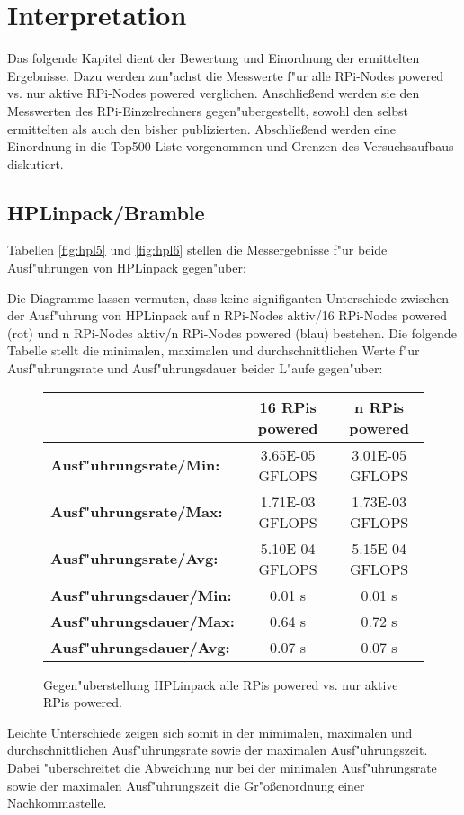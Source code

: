 \chapter{Interpretation}\label{Kap4}

Das folgende Kapitel dient der Bewertung und Einordnung der ermittelten Ergebnisse. Dazu werden zun"achst die Messwerte f"ur alle RPi-Nodes powered vs. nur aktive RPi-Nodes powered verglichen. Anschlie\ss end werden sie den Messwerten des RPi-Einzelrechners gegen"ubergestellt, sowohl den selbst ermittelten als auch den bisher publizierten. Abschlie\ss end werden eine Einordnung in die Top500-Liste vorgenommen und Grenzen des Versuchsaufbaus diskutiert. 

\section{HPLinpack/Bramble}\label{Interpretation-Linpack}

Tabellen \ref{fig:hpl5} und \ref{fig:hpl6} stellen die Messergebnisse f"ur beide Ausf"uhrungen von HPLinpack gegen"uber: 



\noindent
Die Diagramme lassen vermuten, dass keine signifiganten Unterschiede zwischen der Ausf"uhrung von HPLinpack auf n RPi-Nodes aktiv/16 RPi-Nodes powered (rot) und n RPi-Nodes aktiv/n RPi-Nodes powered (blau) bestehen. Die folgende Tabelle stellt die minimalen, maximalen und durchschnittlichen Werte f"ur Ausf"uhrungsrate und Ausf"uhrungsdauer beider L"aufe gegen"uber: 

\begin{figure}[h!]
  \centering
  \begin{tabular}{|l|c|c|}
    \hline 
     & \textbf{16 RPis powered} & \textbf{n RPis powered}\\ 
    \hline 
    \textbf{Ausf"uhrungsrate/Min:} & 3.65E-05 GFLOPS & 3.01E-05 GFLOPS \\
    \hline 
    \textbf{Ausf"uhrungsrate/Max:} & 1.71E-03 GFLOPS & 1.73E-03 GFLOPS \\
    \hline 
    \textbf{Ausf"uhrungsrate/Avg:} & 5.10E-04 GFLOPS & 5.15E-04 GFLOPS \\
    \hline 
    \textbf{Ausf"uhrungsdauer/Min:} & 0.01 s & 0.01 s \\
    \hline 
    \textbf{Ausf"uhrungsdauer/Max:} & 0.64 s & 0.72 s \\
	\hline 
    \textbf{Ausf"uhrungsdauer/Avg:} & 0.07 s & 0.07 s\\
    \hline
  \end{tabular}
  \caption{Gegen"uberstellung HPLinpack alle RPis powered vs. nur aktive RPis powered.}\label{fig:hpl-vgl}
\end{figure}
\noindent
Leichte Unterschiede zeigen sich somit in der mimimalen, maximalen und durchschnittlichen Ausf"uhrungsrate sowie der maximalen Ausf"uhrungszeit. Dabei "uberschreitet die Abweichung nur bei der minimalen Ausf"uhrungsrate sowie der maximalen Ausf"uhrungszeit die Gr"o\ss enordnung einer Nachkommastelle. 

